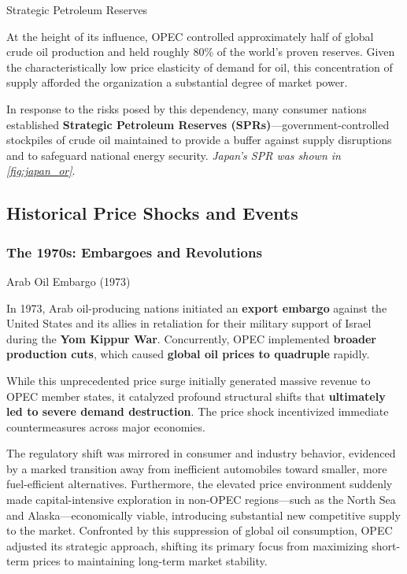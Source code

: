 \documentclass[10pt]{article}
\begin{document}
    \begin{core}[label=core:spr]{Strategic Petroleum Reserves}

      At the height of its influence, OPEC controlled approximately half of global crude oil production and held roughly 80\% of the world's proven reserves. Given the characteristically low price elasticity of demand for oil, this concentration of supply afforded the organization a substantial degree of market power.

      In response to the risks posed by this dependency, many consumer nations established \textbf{Strategic Petroleum Reserves (SPRs)}---government-controlled stockpiles of crude oil maintained to provide a buffer against supply disruptions and to safeguard national energy security. \textit{Japan's SPR was shown in \autoref{fig:japan_or}}.

    \end{core}

  \subsection{Historical Price Shocks and Events}
    \label{sec:oil_history}

    \subsubsection{The 1970s: Embargoes and Revolutions}

    \begin{core}[label=core:oil_embargo]{Arab Oil Embargo (1973)}

        In 1973, Arab oil-producing nations initiated an \textbf{export embargo} against the United States and its allies in retaliation for their military support of Israel during the \textbf{Yom Kippur War}. Concurrently, OPEC implemented \textbf{broader production cuts}, which caused \textbf{global oil prices to quadruple} rapidly.


        While this unprecedented price surge initially generated massive revenue to OPEC member states, it catalyzed profound structural shifts that \textbf{ultimately led to severe demand destruction}. The price shock incentivized immediate countermeasures across major economies.

        The regulatory shift was mirrored in consumer and industry behavior, evidenced by a marked transition away from inefficient automobiles toward smaller, more fuel-efficient alternatives. Furthermore, the elevated price environment suddenly made capital-intensive exploration in non-OPEC regions---such as the North Sea and Alaska---economically viable, introducing substantial new competitive supply to the market. Confronted by this suppression of global oil consumption, OPEC adjusted its strategic approach, shifting its primary focus from maximizing short-term prices to maintaining long-term market stability.

      \end{core}
\end{document}
